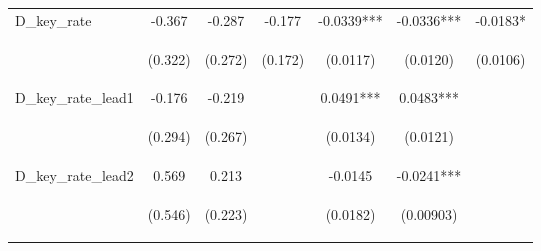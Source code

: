 \documentclass[]{article}
\begin{document}
\begin{center}
\begin{tabular}{lcccccc}
D\_key\_rate & -0.367 & -0.287 & -0.177 & -0.0339*** & -0.0336*** & -0.0183* \\
\vspace{4pt} & \begin{footnotesize}(0.322)\end{footnotesize} & \begin{footnotesize}(0.272)\end{footnotesize} & \begin{footnotesize}(0.172)\end{footnotesize} & \begin{footnotesize}(0.0117)\end{footnotesize} & \begin{footnotesize}(0.0120)\end{footnotesize} & \begin{footnotesize}(0.0106)\end{footnotesize} \\
D\_key\_rate\_lead1 & -0.176 & -0.219 &  & 0.0491*** & 0.0483*** &  \\
\vspace{4pt} & \begin{footnotesize}(0.294)\end{footnotesize} & \begin{footnotesize}(0.267)\end{footnotesize} & \begin{footnotesize}\end{footnotesize} & \begin{footnotesize}(0.0134)\end{footnotesize} & \begin{footnotesize}(0.0121)\end{footnotesize} & \begin{footnotesize}\end{footnotesize} \\
D\_key\_rate\_lead2 & 0.569 & 0.213 &  & -0.0145 & -0.0241*** &  \\
\vspace{4pt} & \begin{footnotesize}(0.546)\end{footnotesize} & \begin{footnotesize}(0.223)\end{footnotesize} & \begin{footnotesize}\end{footnotesize} & \begin{footnotesize}(0.0182)\end{footnotesize} & \begin{footnotesize}(0.00903)\end{footnotesize} & \begin{footnotesize}\end{footnotesize} \\

\end{tabular}
\end{center}
\end{document}
